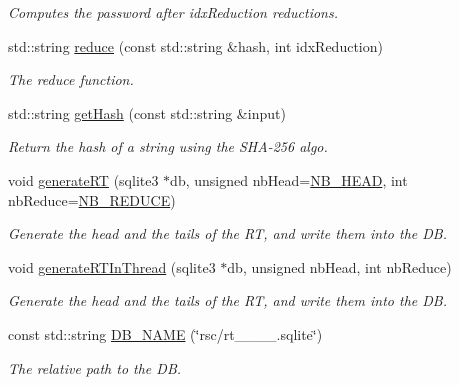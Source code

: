 \begin{DoxyCompactItemize}
\begin{DoxyCompactList}\small\item\em Computes the password after idx\+Reduction reductions. \end{DoxyCompactList}\item 
std\+::string \hyperlink{namespacebe_1_1esi_1_1secl_1_1pn_a836b009c7f5659a17dfa8b4a72eb2d43}{reduce} (const std\+::string \&hash, int idx\+Reduction)
\begin{DoxyCompactList}\small\item\em The reduce function. \end{DoxyCompactList}\item 
std\+::string \hyperlink{namespacebe_1_1esi_1_1secl_1_1pn_ae632580f253a58884f56ee2cb4e7b59d}{get\+Hash} (const std\+::string \&input)
\begin{DoxyCompactList}\small\item\em Return the hash of a string using the S\+H\+A-\/256 algo. \end{DoxyCompactList}\item 
void \hyperlink{namespacebe_1_1esi_1_1secl_1_1pn_af8b773cad93b0eb78b89f69721e4bb1d}{generate\+RT} (sqlite3 $\ast$db, unsigned nb\+Head=\hyperlink{namespacebe_1_1esi_1_1secl_1_1pn_a3f7aaccb1bf4e47f92d72bf9b2471328}{N\+B\+\_\+\+H\+E\+AD}, int nb\+Reduce=\hyperlink{namespacebe_1_1esi_1_1secl_1_1pn_a9434f9e96778e243fcb677633df38598}{N\+B\+\_\+\+R\+E\+D\+U\+CE})
\begin{DoxyCompactList}\small\item\em Generate the head and the tails of the RT, and write them into the DB. \end{DoxyCompactList}\item 
void \hyperlink{namespacebe_1_1esi_1_1secl_1_1pn_aaf5216f5718720c15b5925f7e8a94d10}{generate\+R\+T\+In\+Thread} (sqlite3 $\ast$db, unsigned nb\+Head, int nb\+Reduce)
\begin{DoxyCompactList}\small\item\em Generate the head and the tails of the RT, and write them into the DB. \end{DoxyCompactList}\item 
const std\+::string \hyperlink{namespacebe_1_1esi_1_1secl_1_1pn_a96589f0878fe9f2dbdf42d959f11b68e}{D\+B\+\_\+\+N\+A\+ME} (\char`\"{}rsc/rt\+\_\+\_\+\_\+\_.\+sqlite\char`\"{})
\begin{DoxyCompactList}\small\item\em The relative path to the DB. \end{DoxyCompactList}\end{DoxyCompactItemize}
